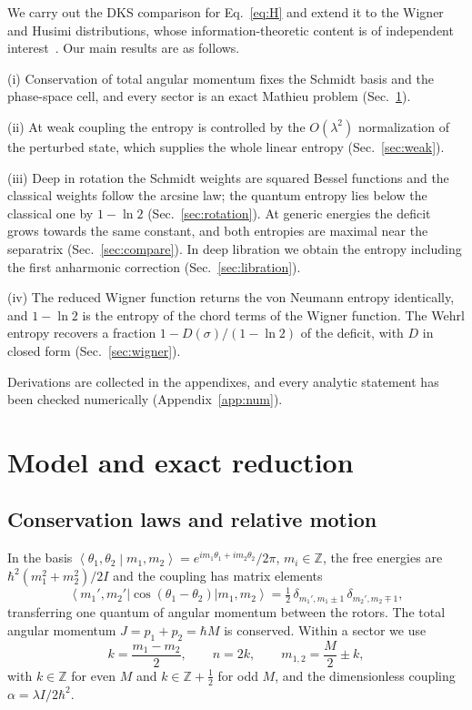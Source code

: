\documentclass[pra,twocolumn,superscriptaddress,longbibliography,floatfix]{revtex4-2}
\newcommand{\ket}[1]{\left|#1\right\rangle}
\newcommand{\bra}[1]{\left\langle#1\right|}
\newcommand{\braket}[2]{\left\langle#1\middle|#2\right\rangle}
\begin{document}
We carry out the DKS comparison for Eq.~\eqref{eq:H} and extend it to the
Wigner and Husimi distributions, whose information-theoretic content is of
independent interest~\cite{Wehrl,PSinfo1,PSinfo2}. Our main results are as
follows.

(i) Conservation of total angular momentum fixes the Schmidt basis and the
phase-space cell, and every sector is an exact Mathieu problem
(Sec.~\ref{sec:model}).

(ii) At weak coupling the entropy is controlled by the $O(\lambda^{2})$
normalization of the perturbed state, which supplies the whole linear entropy
(Sec.~\ref{sec:weak}).

(iii) Deep in rotation the Schmidt weights are squared Bessel functions and the
classical weights follow the arcsine law; the quantum entropy lies below the
classical one by $1-\ln2$ (Sec.~\ref{sec:rotation}). At generic energies the
deficit grows towards the same constant, and both entropies are maximal near the
separatrix (Sec.~\ref{sec:compare}). In deep libration we obtain the entropy
including the first anharmonic correction (Sec.~\ref{sec:libration}).

(iv) The reduced Wigner function returns the von Neumann entropy identically,
and $1-\ln2$ is the entropy of the chord terms of the Wigner function. The
Wehrl entropy recovers a fraction $1-D(\sigma)/(1-\ln2)$ of the deficit, with
$D$ in closed form (Sec.~\ref{sec:wigner}).

Derivations are collected in the appendixes, and every analytic statement has
been checked numerically (Appendix~\ref{app:num}).

\section{Model and exact reduction}
\label{sec:model}

\subsection{Conservation laws and relative motion}

In the basis $\braket{\theta_{1},\theta_{2}}{m_{1},m_{2}}=
e^{im_{1}\theta_{1}+im_{2}\theta_{2}}/2\pi$, $m_{i}\in\mathbb{Z}$, the free
energies are $\hbar^{2}(m_{1}^{2}+m_{2}^{2})/2I$ and the coupling has matrix
elements
\begin{equation}
\bra{m_{1}',m_{2}'}\cos(\theta_{1}-\theta_{2})\ket{m_{1},m_{2}}
=\tfrac12\,\delta_{m_{1}',m_{1}\pm1}\,\delta_{m_{2}',m_{2}\mp1},
\label{eq:V}
\end{equation}
transferring one quantum of angular momentum between the rotors. The total
angular momentum $J=p_{1}+p_{2}=\hbar M$ is conserved. Within a sector we use
\begin{equation}
k=\frac{m_{1}-m_{2}}{2},\qquad n=2k,\qquad
m_{1,2}=\frac{M}{2}\pm k,
\label{eq:k}
\end{equation}
with $k\in\mathbb{Z}$ for even $M$ and $k\in\mathbb{Z}+\tfrac12$ for odd $M$, and
the dimensionless coupling $\alpha=\lambda I/2\hbar^{2}$.
\end{document}
